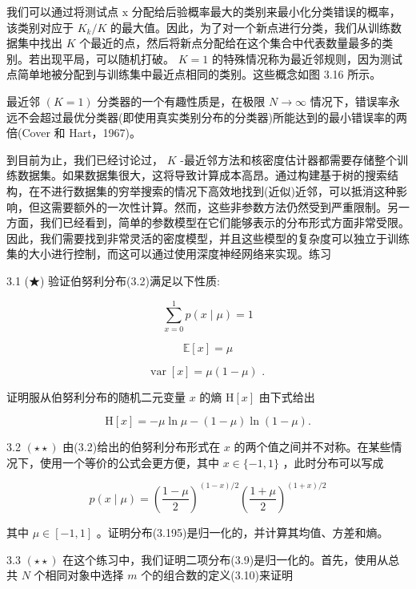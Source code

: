 \documentclass[10pt]{article}
\begin{document}
我们可以通过将测试点 \(\mathrm{x}\) 分配给后验概率最大的类别来最小化分类错误的概率，该类别对应于 \({K}_{k}/K\) 的最大值。因此，为了对一个新点进行分类，我们从训练数据集中找出 \(K\) 个最近的点，然后将新点分配给在这个集合中代表数量最多的类别。若出现平局，可以随机打破。 \(K = 1\) 的特殊情况称为最近邻规则，因为测试点简单地被分配到与训练集中最近点相同的类别。这些概念如图 3.16 所示。

最近邻 \(\left( {K = 1}\right)\) 分类器的一个有趣性质是，在极限 \(N \rightarrow  \infty\) 情况下，错误率永远不会超过最优分类器(即使用真实类别分布的分类器)所能达到的最小错误率的两倍(Cover 和 Hart，1967)。

到目前为止，我们已经讨论过， \(K\) -最近邻方法和核密度估计器都需要存储整个训练数据集。如果数据集很大，这将导致计算成本高昂。通过构建基于树的搜索结构，在不进行数据集的穷举搜索的情况下高效地找到(近似)近邻，可以抵消这种影响，但这需要额外的一次性计算。然而，这些非参数方法仍然受到严重限制。另一方面，我们已经看到，简单的参数模型在它们能够表示的分布形式方面非常受限。因此，我们需要找到非常灵活的密度模型，并且这些模型的复杂度可以独立于训练集的大小进行控制，而这可以通过使用深度神经网络来实现。练习

3.1 (★) 验证伯努利分布(3.2)满足以下性质:

\[
\mathop{\sum }\limits_{{x = 0}}^{1}p\left( {x \mid  \mu }\right)  = 1 \tag{3.191}
\]

\[
\mathbb{E}\left\lbrack  x\right\rbrack   = \mu  \tag{3.192}
\]

\[
\operatorname{var}\left\lbrack  x\right\rbrack   = \mu \left( {1 - \mu }\right) \text{ . } \tag{3.193}
\]

证明服从伯努利分布的随机二元变量 \(x\) 的熵 \(\mathrm{H}\left\lbrack  x\right\rbrack\) 由下式给出

\[
\mathrm{H}\left\lbrack  x\right\rbrack   =  - \mu \ln \mu  - \left( {1 - \mu }\right) \ln \left( {1 - \mu }\right) . \tag{3.194}
\]

3.2 \(\left( {\star  \star  }\right)\) 由(3.2)给出的伯努利分布形式在 \(x\) 的两个值之间并不对称。在某些情况下，使用一个等价的公式会更方便，其中 \(x \in  \{  - 1,1\}\) ，此时分布可以写成

\[
p\left( {x \mid  \mu }\right)  = {\left( \frac{1 - \mu }{2}\right) }^{\left( {1 - x}\right) /2}{\left( \frac{1 + \mu }{2}\right) }^{\left( {1 + x}\right) /2} \tag{3.195}
\]

其中 \(\mu  \in  \left\lbrack  {-1,1}\right\rbrack\) 。证明分布(3.195)是归一化的，并计算其均值、方差和熵。

3.3 \(\left( {\star  \star  }\right)\) 在这个练习中，我们证明二项分布(3.9)是归一化的。首先，使用从总共 \(N\) 个相同对象中选择 \(m\) 个的组合数的定义(3.10)来证明
\end{document}
